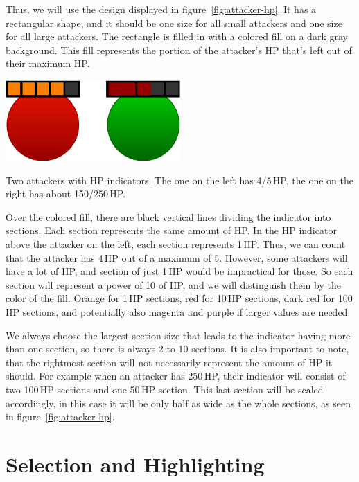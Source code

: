 Thus, we will use the design displayed in figure~\ref{fig:attacker-hp}.
It has a rectangular shape, and it should be one size for all small attackers and one size for all large attackers.
The rectangle is filled in with a colored fill on a dark gray background.
This fill represents the portion of the attacker's HP that's left out of their maximum HP.

\begin{center}
    \captionsetup{type=figure}
    \includegraphics[width=0.5\textwidth]{img/Attacker HP.pdf}
    \caption{Two attackers with HP indicators. The one on the left has 4/5\,HP, the one on the right has about 150/250\,HP.}
    \label{fig:attacker-hp}
\end{center}

Over the colored fill, there are black vertical lines dividing the indicator into sections.
Each section represents the same amount of HP.
In the HP indicator above the attacker on the left, each section represents 1\,HP.
Thus, we can count that the attacker has 4\,HP out of a maximum of 5.
However, some attackers will have a lot of HP, and section of just 1\,HP would be impractical for those.
So each section will represent a power of 10 of HP, and we will distinguish them by the color of the fill.
Orange for 1\,HP sections, red for 10\,HP sections, dark red for 100\,HP sections, and potentially also magenta and purple if larger values are needed.

We always choose the largest section size that leads to the indicator having more than one section, so there is always 2 to 10 sections.
It is also important to note, that the rightmost section will not necessarily represent the amount of HP it should.
For example when an attacker has 250\,HP, their indicator will consist of two 100\,HP sections and one 50\,HP section.
This last section will be scaled accordingly, in this case it will be only half as wide as the whole sections, as seen in figure~\ref{fig:attacker-hp}.

\section{Selection and Highlighting}

